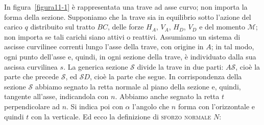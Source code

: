 \noindent In figura~\ref{figura11-1} è rappresentata una trave ad asse curvo; non importa la forma della sezione. Supponiamo che la trave sia in equilibrio sotto l'azione del carico $q$ distribuito sul tratto $BC$, delle forze $H_{A}$, $V_{A}$, $H_{D}$, $V_{D}$ e del momento $\mathcal{M}$; non importa se tali carichi siano attivi o reattivi. Assumiamo un sistema di ascisse curvilinee correnti lungo l'asse della trave, con origine in $A$; in tal modo, ogni punto dell'asse e, quindi, in ogni sezione della trave, è individuato dalla sua ascissa curvilinea $s$. La generica sezione $\mathcal{S}$ divide la trave in due parti: $A\mathcal{S}$, cioè la parte che precede $\mathcal{S}$, ed $\mathcal{S}D$, cioè la parte che segue. In corrispondenza della sezione $\mathcal{S}$ abbiamo segnato la retta normale al piano della sezione e, quindi, tangente all'asse, indicandola con $n$. Abbiamo anche segnato la retta $t$ perpendicolare ad $n$. Si indica poi con $\alpha$ l'angolo che $n$ forma con l'orizzontale e quindi $t$ con la verticale. Ed ecco la definizione di \textsc{sforzo normale} $N$:
\\

